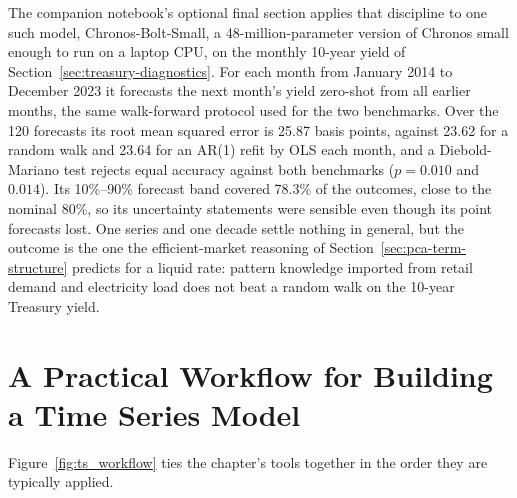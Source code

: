 \documentclass[../ai_in_finance]{subfiles}
\begin{document}
The companion notebook's optional final section applies that discipline to one such model, Chronos-Bolt-Small, a 48-million-parameter version of Chronos small enough to run on a laptop CPU, on the monthly 10-year yield of Section~\ref{sec:treasury-diagnostics}. For each month from January 2014 to December 2023 it forecasts the next month's yield zero-shot from all earlier months, the same walk-forward protocol used for the two benchmarks. Over the 120 forecasts its root mean squared error is 25.87 basis points, against 23.62 for a random walk and 23.64 for an AR(1) refit by OLS each month, and a Diebold-Mariano test rejects equal accuracy against both benchmarks ($p = 0.010$ and $0.014$). Its 10\%--90\% forecast band covered 78.3\% of the outcomes, close to the nominal 80\%, so its uncertainty statements were sensible even though its point forecasts lost. One series and one decade settle nothing in general, but the outcome is the one the efficient-market reasoning of Section~\ref{sec:pca-term-structure} predicts for a liquid rate: pattern knowledge imported from retail demand and electricity load does not beat a random walk on the 10-year Treasury yield.

\section{A Practical Workflow for Building a Time Series Model}

Figure~\ref{fig:ts_workflow} ties the chapter's tools together in the order they are typically applied.
\end{document}
